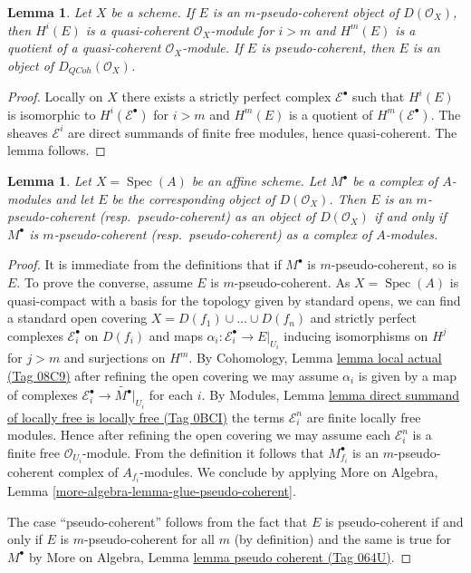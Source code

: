 \documentclass{amsart}
\theoremstyle{plain}
\newtheorem{lemma}[subsection]{Lemma}
\theoremstyle{definition}
\theoremstyle{remark}
\numberwithin{equation}{subsection}
\def\Spec{\mathop{\mathrm{Spec}}}
\def\QCoh{\mathit{QCoh}}
\begin{document}
\begin{lemma}
\label{lemma-pseudo-coherent}
Let $X$ be a scheme. If $E$ is an $m$-pseudo-coherent
object of $D(\mathcal{O}_X)$, then $H^i(E)$ is a quasi-coherent
$\mathcal{O}_X$-module for $i > m$ and $H^m(E)$ is a quotient
of a quasi-coherent $\mathcal{O}_X$-module.
If $E$ is pseudo-coherent, then $E$ is an object of
$D_\QCoh(\mathcal{O}_X)$.
\end{lemma}

\begin{proof}
Locally on $X$ there exists a strictly perfect complex $\mathcal{E}^\bullet$
such that $H^i(E)$ is isomorphic to $H^i(\mathcal{E}^\bullet)$ for $i > m$
and $H^m(E)$ is a quotient of $H^m(\mathcal{E}^\bullet)$. The sheaves
$\mathcal{E}^i$ are direct summands of finite free modules,
hence quasi-coherent. The lemma follows.
\end{proof}


\begin{lemma}
\label{lemma-pseudo-coherent-affine}
Let $X = \Spec(A)$ be an affine scheme. Let $M^\bullet$ be a
complex of $A$-modules and let $E$ be the corresponding object
of $D(\mathcal{O}_X)$. Then $E$ is an $m$-pseudo-coherent
(resp.\ pseudo-coherent) as an object of $D(\mathcal{O}_X)$
if and only if $M^\bullet$ is $m$-pseudo-coherent (resp.\ pseudo-coherent)
as a complex of $A$-modules.
\end{lemma}

\begin{proof}
It is immediate from the definitions that if $M^\bullet$ is
$m$-pseudo-coherent, so is $E$. To prove the converse, assume
$E$ is $m$-pseudo-coherent. As $X = \Spec(A)$ is quasi-compact with
a basis for the topology given by standard opens, we can find a standard
open covering $X = D(f_1) \cup \ldots \cup D(f_n)$ and strictly
perfect complexes $\mathcal{E}_i^\bullet$ on $D(f_i)$ and
maps $\alpha_i : \mathcal{E}_i^\bullet \to E|_{U_i}$ inducing
isomorphisms on $H^j$ for $j > m$ and surjections on $H^m$.
By Cohomology, Lemma \href{https://stacks.math.columbia.edu/tag/08C9}{lemma local actual (Tag 08C9)}
after refining the open covering
we may assume $\alpha_i$ is given by a map of complexes
$\mathcal{E}_i^\bullet \to \widetilde{M^\bullet}|_{U_i}$
for each $i$. By Modules, Lemma
\href{https://stacks.math.columbia.edu/tag/0BCI}{lemma direct summand of locally free is locally free (Tag 0BCI)}
the terms $\mathcal{E}_i^n$ are finite locally free modules.
Hence after refining the open covering we may assume each
$\mathcal{E}_i^n$ is a finite free $\mathcal{O}_{U_i}$-module.
From the definition it follows that $M^\bullet_{f_i}$ is
an $m$-pseudo-coherent complex of $A_{f_i}$-modules.
We conclude by applying
More on Algebra, Lemma \ref{more-algebra-lemma-glue-pseudo-coherent}.

\medskip\noindent
The case ``pseudo-coherent'' follows from the fact that $E$ is
pseudo-coherent if and only if $E$ is $m$-pseudo-coherent for
all $m$ (by definition) and the same is true for $M^\bullet$
by More on Algebra, Lemma \href{https://stacks.math.columbia.edu/tag/064U}{lemma pseudo coherent (Tag 064U)}.
\end{proof}
\end{document}
